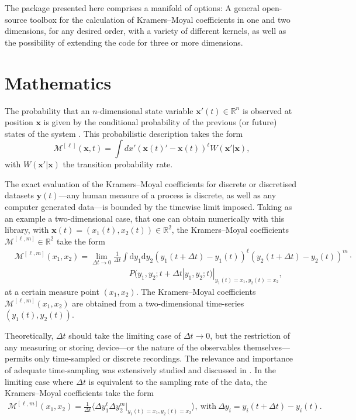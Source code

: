 \documentclass[showpacs,showkeys,10pt,onecolumn,superscriptaddress,notitlepage]{revtex4-1}
\begin{document}
The package presented here comprises a manifold of options: A general open-source toolbox for the calculation of Kramers--Moyal coefficients in one and two dimensions, for any desired order, with a variety of different kernels, as well as the possibility of extending the code for three or more dimensions.

\section{Mathematics}

The probability that an $n$-dimensional state variable $\boldsymbol{x}'(t)\in\mathbb{R}^n$ is observed at position $\boldsymbol{x}$ is given by the conditional probability of the previous (or future) states of the system \cite{Risken}.
This probabilistic description takes the form
\begin{equation}
\mathcal{M}^{[\ell]}(\boldsymbol{x},t)=\int  dx'(\boldsymbol{x}(t)'-\boldsymbol{x}(t))^\ell W(\boldsymbol{x}'|\boldsymbol{x}),
\end{equation}
with $W(\boldsymbol{x}'|\boldsymbol{x})$ the transition probability rate.

The exact evaluation of the Kramers--Moyal coefficients for discrete or discretised datasets $\boldsymbol{y}(t)$---any human measure of a process is discrete, as well as any computer generated data---is bounded by the timewise limit imposed.
Taking as an example a two-dimensional case, that one can obtain numerically with this library, with $\boldsymbol{x}(t)=(x_1(t),x_2(t))\in\mathbb{R}^{2}$, the Kramers--Moyal coefficients $\mathcal{M}^{[\ell, m]}\in\mathbb{R}^{2}$ take the form
\begin{equation}
\begin{aligned}
&\mathcal{M}^{[\ell, m]}(x_1,x_2)=\lim_{\Delta t\to 0}\!\frac{1}{\Delta t}\int \mathrm{d} y_1 \mathrm{d} y_2 (y_1(t\!+\!\Delta t)\!-\!y_1(t))^\ell(y_2(t\!+\!\Delta t)\!-y_2(t))^m \cdot \\
& \qquad \qquad \qquad \qquad \qquad \qquad \qquad P(y_1,y_2; t\!+\!\Delta t|y_1,y_2 ; t)|_{y_1(t)=x_1, y_2(t)=x_2},
\end{aligned}
\end{equation}
at a certain measure point $(x_1,x_2)$. The Kramers--Moyal coefficients $\mathcal{M}^{[\ell, m]}(x_1,x_2)$ are obtained from a two-dimensional time-series $(y_1(t),y_2(t))$.

Theoretically, $\Delta t$ should take the limiting case of $\Delta t \to 0$, but the restriction of any measuring or storing device---or the nature of the observables themselves---permits only time-sampled or discrete recordings.
The relevance and importance of adequate time-sampling was extensively studied and discussed in \cite{Lehnertz}.
In the limiting case where $\Delta t$ is equivalent to the sampling rate of the data, the Kramers--Moyal coefficients take the form
\begin{equation}
\begin{aligned}
\mathcal{M}^{[\ell, m]}(x_1, x_2) = \frac{1}{\Delta t} \langle \Delta y_1^{\ell} \Delta y_2^{m} |_{y_1(t)=x_1, y_2(t)=x_2}\rangle,~\mathrm{with}~\Delta y_i =  y_i(t+ \Delta t) - y_i(t).
\end{aligned}
\end{equation}
\end{document}
